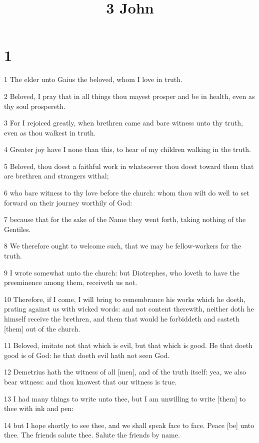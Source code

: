 

\title{3 John}

\chapter{1}

\par 1 The elder unto Gaius the beloved, whom I love in truth.
\par 2 Beloved, I pray that in all things thou mayest prosper and be in health, even as thy soul prospereth.
\par 3 For I rejoiced greatly, when brethren came and bare witness unto thy truth, even as thou walkest in truth.
\par 4 Greater joy have I none than this, to hear of my children walking in the truth.
\par 5 Beloved, thou doest a faithful work in whatsoever thou doest toward them that are brethren and strangers withal;
\par 6 who bare witness to thy love before the church: whom thou wilt do well to set forward on their journey worthily of God:
\par 7 because that for the sake of the Name they went forth, taking nothing of the Gentiles.
\par 8 We therefore ought to welcome such, that we may be fellow-workers for the truth.
\par 9 I wrote somewhat unto the church: but Diotrephes, who loveth to have the preeminence among them, receiveth us not.
\par 10 Therefore, if I come, I will bring to remembrance his works which he doeth, prating against us with wicked words: and not content therewith, neither doth he himself receive the brethren, and them that would he forbiddeth and casteth [them] out of the church.
\par 11 Beloved, imitate not that which is evil, but that which is good. He that doeth good is of God: he that doeth evil hath not seen God.
\par 12 Demetrius hath the witness of all [men], and of the truth itself: yea, we also bear witness: and thou knowest that our witness is true.
\par 13 I had many things to write unto thee, but I am unwilling to write [them] to thee with ink and pen:
\par 14 but I hope shortly to see thee, and we shall speak face to face. Peace [be] unto thee. The friends salute thee. Salute the friends by name.

